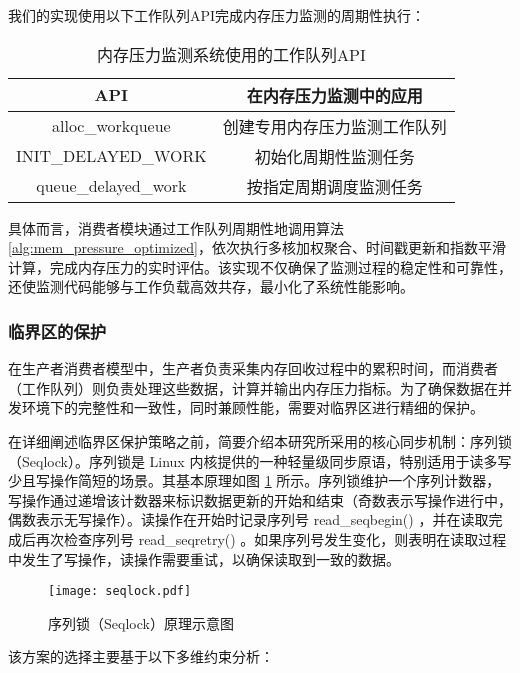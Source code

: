 我们的实现使用以下工作队列API完成内存压力监测的周期性执行：

\begin{table}[htbp]
\centering
\caption{内存压力监测系统使用的工作队列API}
\label{tab:workqueue_api}
\begin{tabular}{cc}
\toprule
\textbf{API} & \textbf{在内存压力监测中的应用} \\
\midrule
alloc\_workqueue & 创建专用内存压力监测工作队列 \\
INIT\_DELAYED\_WORK & 初始化周期性监测任务 \\
queue\_delayed\_work & 按指定周期调度监测任务 \\
\bottomrule
\end{tabular}
\end{table}

具体而言，消费者模块通过工作队列周期性地调用算法\ref{alg:mem_pressure_optimized}，依次执行多核加权聚合、时间戳更新和指数平滑计算，完成内存压力的实时评估。该实现不仅确保了监测过程的稳定性和可靠性，还使监测代码能够与工作负载高效共存，最小化了系统性能影响。

\subsubsection{临界区的保护}

在生产者消费者模型中，生产者负责采集内存回收过程中的累积时间，而消费者（工作队列）则负责处理这些数据，计算并输出内存压力指标。为了确保数据在并发环境下的完整性和一致性，同时兼顾性能，需要对临界区进行精细的保护。

在详细阐述临界区保护策略之前，简要介绍本研究所采用的核心同步机制：序列锁（Seqlock）。序列锁是 Linux 内核提供的一种轻量级同步原语，特别适用于读多写少且写操作简短的场景。其基本原理如图 \ref{fig:seqlock} 所示。序列锁维护一个序列计数器，写操作通过递增该计数器来标识数据更新的开始和结束（奇数表示写操作进行中，偶数表示无写操作）。读操作在开始时记录序列号 read\_seqbegin() ，并在读取完成后再次检查序列号 read\_seqretry() 。如果序列号发生变化，则表明在读取过程中发生了写操作，读操作需要重试，以确保读取到一致的数据。

\begin{figure}[H]
    \centering
    \texttt{[image: seqlock.pdf]}
    \caption{序列锁（Seqlock）原理示意图}
    \label{fig:seqlock}
\end{figure}

该方案的选择主要基于以下多维约束分析：

